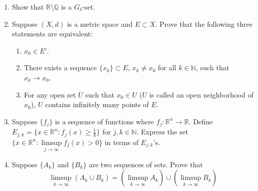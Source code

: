 \documentclass{article}
\begin{document}
\begin{enumerate}

\item Show that $\mathbb{R}\setminus \mathbb{Q}$ is a $G_{\delta}$-set.




\item Suppose $(X,d)$ is a metric space and $E \subset X$. Prove that the following three statements are equivalent:

\begin{enumerate}
\item $x_{0} \in E'$.
\item There exists a sequence $\{x_{k}\} \subset E$, $x_{k} \ne x_{0}$ for all $k\in\mathbb{N}$, such that $x_{k}\to x_{0}$.
\item For any open set $U$ such that $x_{0} \in U$ ($U$ is called an open neighborhood of $x_{0}$), $U$ contains infinitely many points of $E$.
\end{enumerate}




\item Suppose $\{f_{j}\}$ is a sequence of functions where $f_{j}: \mathbb{R}^{n} \to \mathbb{R}$. Define $E_{j,k} = \{x \in \mathbb{R}^n: f_{j}(x) \ge \frac{1}{k}\}$ for $j,k\in \mathbb{N}$. Express the set $\{x \in \mathbb{R}^{n}: \limsup\limits_{j\to\infty} f_{j}(x) > 0\}$ in terms of $E_{j,k}$'s.




\item Suppose $\{A_{k}\}$ and $\{B_{k}\}$ are two sequences of sets. Prove that
\[
\limsup_{k\to\infty} (A_{k} \cup B_{k}) = \left(\limsup_{k\to\infty} A_{k} \right) \cup \left(\limsup_{k\to\infty} B_{k} \right)
\]


\end{enumerate}
\end{document}
